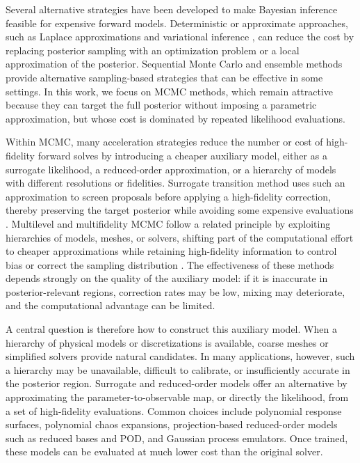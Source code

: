\documentclass{elsarticle}
\begin{document}
Several alternative strategies have been developed to make Bayesian inference feasible for expensive forward models. Deterministic or approximate approaches, such as Laplace approximations \cite{SSW20,HK22} and variational inference \cite{PKFGG22,JZXML21}, can reduce the cost by replacing posterior sampling with an optimization problem or a local approximation of the posterior. Sequential Monte Carlo \cite{BJ15,KB14,WZ11} and ensemble methods \cite{ILS13,I16} provide alternative sampling-based strategies that can be effective in some settings. In this work, we focus on MCMC methods, which remain attractive because they can target the full posterior without imposing a parametric approximation, but whose cost is dominated by repeated likelihood evaluations.

Within MCMC, many acceleration strategies reduce the number or cost of
high-fidelity forward solves by introducing a cheaper auxiliary model, either
as a surrogate likelihood, a reduced-order approximation, or a hierarchy of
models with different resolutions or fidelities. Surrogate transition method uses such
an approximation to screen proposals before applying a high-fidelity
correction, thereby preserving the target posterior while avoiding some
expensive evaluations \cite{CF05,Banterle2019}. Multilevel and multifidelity MCMC follow a
related principle by exploiting hierarchies of models, meshes, or solvers,
shifting part of the computational effort to cheaper approximations while
retaining high-fidelity information to control bias or correct the sampling
distribution \cite{DKST19,LD23,PM19,Peherstorfer2018}. The effectiveness of these methods
depends strongly on the quality of the auxiliary model: if it is inaccurate
in posterior-relevant regions, correction rates may be low, mixing may
deteriorate, and the computational advantage can be limited.

A central question is therefore how to construct this auxiliary model. When a
hierarchy of physical models or discretizations is available, coarse meshes or
simplified solvers provide natural candidates. In many applications, however,
such a hierarchy may be unavailable, difficult to calibrate, or insufficiently
accurate in the posterior region. Surrogate and reduced-order models offer an
alternative by approximating the parameter-to-observable map, or directly the
likelihood, from a set of high-fidelity evaluations. Common choices include
polynomial response surfaces, polynomial chaos expansions, projection-based
reduced-order models such as reduced bases and POD, and Gaussian process
emulators. Once trained, these models can be evaluated at much lower cost
than the original solver.
\end{document}
